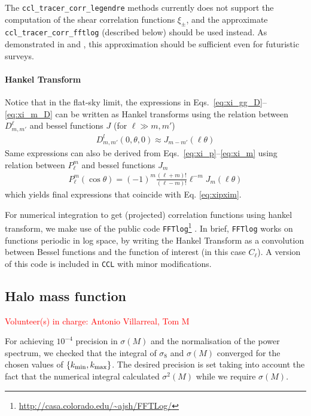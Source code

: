 \documentclass[\docopts]{\docclass}
\newcommand{\vol}[1]{\textcolor{red}{Volunteer(s) in charge: #1}}
\newcommand{\ccl}{{\tt CCL}\xspace}
\begin{document}
The {\tt ccl\_tracer\_corr\_legendre} methods currently does not support the computation of the shear correlation functions $\xi_{\pm}$, and the approximate {\tt ccl\_tracer\_corr\_fftlog} (described below) should be used instead. As demonstrated in \cite{Kilbinger2017} and \cite{Kitching17}, this approximation should be sufficient even for futuristic surveys.

\paragraph{Hankel Transform}
Notice that in the flat-sky limit, the expressions in Eqs.~\ref{eq:xi_gg_D}--\ref{eq:xi_m_D} can be
written as Hankel transforms using the relation between $D_{m,m'}^\ell$ and bessel functions $J$
(for $\ell\gg m,m'$)
\begin{align}
  D^{l}_{m,m'}(0,\theta,0)\approx J_{m-m'}(\ell\theta)
\end{align}
Same expressions can also be derived from Eqs.~\ref{eq:xi_p}--\ref{eq:xi_m} using relation between $P_{\ell}^m$ and bessel functions $J_m$
\citep{Putter2010}
\begin{align}
  P_{\ell}^m(\cos\theta)=(-1)^m\frac{(\ell+m)!}{(\ell-m)!}\ell^{-m}J_m(\ell\theta)
\end{align}
which yields final expressions that coincide with Eq. \ref{eq:xipxim}.

For numerical integration to get (projected) correlation functions using hankel transform,
we make use of the
public code {\tt FFTlog}\footnote{\url{http://casa.colorado.edu/~ajsh/FFTLog/}}
\citep{Hamilton2000,Talman2009}. In brief, {\tt FFTlog} works on functions periodic in log space,
by writing the Hankel Transform as a convolution between Bessel functions and the function of
interest (in this case $C_\ell$). A version of this code is included in \ccl with minor
modifications.


\subsection{Halo mass function}
\label{sec:halo_mass_function_implementation}
\vol{Antonio Villarreal, Tom M}

For achieving $10^{-4}$ precision in $\sigma(M)$ and the normalisation of the power spectrum, we checked that the integral of $\sigma_8$ and $\sigma(M)$ converged for the chosen values of $\{k_{\rm min},k_{\rm max}\}$. The desired precision is set taking into account the fact that the numerical integral calculated $\sigma^2(M)$ while we require $\sigma(M)$.
\end{document}
